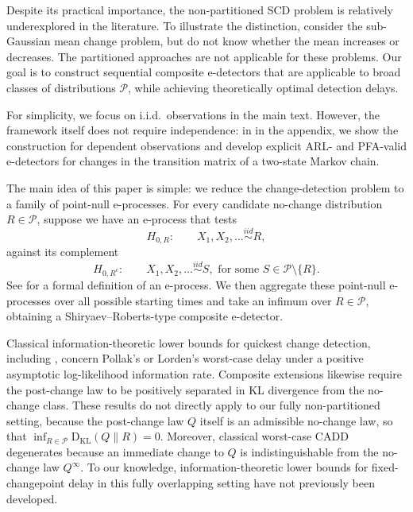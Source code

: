 \documentclass[12pt]{article}
\theoremstyle{spaced}
\theoremstyle{remark}
\newcommand{\calP}{\mathcal P}
\newcommand{\KL}{\mathrm{D}_{\text{KL}}}
\begin{document}
Despite its practical importance, the non-partitioned SCD problem is relatively underexplored in the literature. To illustrate the distinction, consider the sub-Gaussian mean change problem, but do not know whether the mean increases or decreases. The partitioned approaches are not applicable for these problems.
Our goal is to construct sequential composite e-detectors that are applicable to broad classes of distributions $\calP$, while achieving theoretically optimal detection delays.

For simplicity, we focus on i.i.d.\ observations in the main text. However, the framework itself does not require independence: in  in the appendix, we show the construction for dependent observations and develop explicit ARL- and PFA-valid e-detectors for changes in the transition matrix of a two-state Markov chain.

The main idea of this paper is simple: we reduce the change-detection problem to a family of point-null e-processes. For every candidate no-change distribution $R\in\calP$, suppose we have an e-process that tests
\[ H_{0,R}:\qquad X_1,X_2,\ldots \stackrel{iid}{\sim} R,\]
against its complement
\[ H_{0,R^c}:\qquad X_1,X_2,\ldots \stackrel{iid}{\sim} S, \text{ for some } S\in \calP\setminus \{R\}.\]
See  for a formal definition of an e-process.
We then aggregate these point-null e-processes over all possible starting times and take an infimum over $R\in\calP$, obtaining a Shiryaev--Roberts-type composite e-detector. 

Classical information-theoretic lower bounds for quickest change detection, including \cite{lai1998information}, concern Pollak’s or Lorden’s worst-case delay under a positive asymptotic log-likelihood information rate. Composite extensions likewise require the post-change law to be positively separated in KL divergence from the no-change class. These results do not directly apply to our fully non-partitioned setting, because the post-change law
$Q$ itself is an admissible no-change law, so that $\inf_{R\in\calP}\KL(Q\|R)=0$.
Moreover, classical worst-case CADD degenerates because an immediate change to $Q$ is indistinguishable from the no-change law $Q^\infty$. To our knowledge, information-theoretic lower bounds for fixed-changepoint delay in this fully overlapping setting have not previously been developed.

\end{document}
